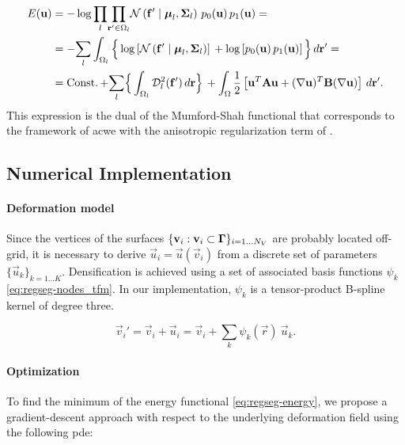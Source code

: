   \begin{align}
  E(\vec{u}) &= -\log \underset{l}{\prod}
  \underset{\vec{r}' \in \Omega_l}{\prod}
  \mathcal{N} \left( \vec{f}' \mid \boldsymbol{\mu}_l, \boldsymbol{\Sigma}_l \right)\,p_0( \vec{u})\,p_1( \vec{u}) =
\notag\\ &= - \underset{l}{\sum} \int_{\Omega_l} \Big\{ \log \left[ \mathcal{N} \left( \vec{f}' \mid \boldsymbol{\mu}_l, \boldsymbol{\Sigma}_l \right) \right] \, + \log \left[ p_0( \vec{u})\,p_1( \vec{u}) \right] \Big\} \, d\vec{r}'
   = \notag\\ &=
  \const + \underset{l}{\sum} \Big\{ \int_{\Omega_l} \mdist{f'}{l} \,d\vec{r} \Big\} \,
  + \int_{\Omega} \frac12 \left[ \vec{u}^T \mathbf{A} \vec{u} + (\nabla \vec{u})^T \mathbf{B} (\nabla \vec{u}) \right] \,d\vec{r}'.
  \label{eq:regseg-energy}
  \end{align}%
This expression is the dual of the Mumford-Shah functional that corresponds
  to the framework of \acrlong*{acwe} \citep{chan_active_2001}
  with the anisotropic regularization term of \cite{nagel_investigation_1986}.


\subsection{Numerical Implementation}
\label{sec:regseg-numerical_implementation}

\paragraph*{Deformation model}\label{sec:regseg-deformation_model}
Since the vertices of the surfaces $\{\mathbf{v}_i: \mathbf{v}_i \subset \boldsymbol{\Gamma} \}_{i=1 \ldots N_V}$
  are probably located off-grid, it is necessary to derive $\vec{u}_i = \vec{u}(\vec{v}_i)$ from a discrete set of parameters
  $\{\vec{u}_k\}_{k=1 \ldots K}$.
Densification is achieved using a set of associated basis functions $\psi_k$ \eqref{eq:regseg-nodes_tfm}.
In our implementation, $\psi_k$ is a tensor-product B-spline kernel of degree three.

  \begin{equation}
  \vec{v}_i' = \vec{v}_i + \vec{u}_i = \vec{v}_i + \sum_k \psi_k(\vec{r}) \: \vec{u}_k.
  \label{eq:regseg-nodes_tfm}
  \end{equation}


\paragraph*{Optimization}
\label{sec:regseg-gradient_descent}
To find the minimum of the energy functional \eqref{eq:regseg-energy},
  we propose a gradient-descent approach with respect to the underlying
  deformation field using the following \gls*{pde}:


